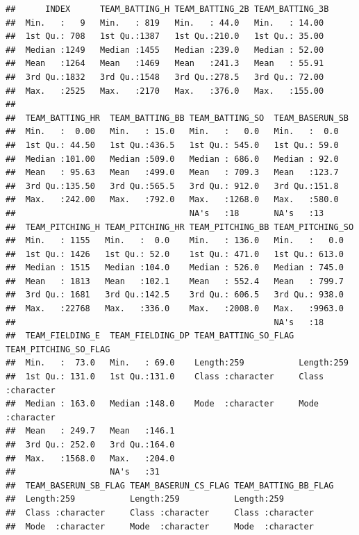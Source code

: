 \documentclass[
]{article}
\begin{document}
\begin{verbatim}
##      INDEX      TEAM_BATTING_H TEAM_BATTING_2B TEAM_BATTING_3B 
##  Min.   :   9   Min.   : 819   Min.   : 44.0   Min.   : 14.00  
##  1st Qu.: 708   1st Qu.:1387   1st Qu.:210.0   1st Qu.: 35.00  
##  Median :1249   Median :1455   Median :239.0   Median : 52.00  
##  Mean   :1264   Mean   :1469   Mean   :241.3   Mean   : 55.91  
##  3rd Qu.:1832   3rd Qu.:1548   3rd Qu.:278.5   3rd Qu.: 72.00  
##  Max.   :2525   Max.   :2170   Max.   :376.0   Max.   :155.00  
##                                                                
##  TEAM_BATTING_HR  TEAM_BATTING_BB TEAM_BATTING_SO  TEAM_BASERUN_SB
##  Min.   :  0.00   Min.   : 15.0   Min.   :   0.0   Min.   :  0.0  
##  1st Qu.: 44.50   1st Qu.:436.5   1st Qu.: 545.0   1st Qu.: 59.0  
##  Median :101.00   Median :509.0   Median : 686.0   Median : 92.0  
##  Mean   : 95.63   Mean   :499.0   Mean   : 709.3   Mean   :123.7  
##  3rd Qu.:135.50   3rd Qu.:565.5   3rd Qu.: 912.0   3rd Qu.:151.8  
##  Max.   :242.00   Max.   :792.0   Max.   :1268.0   Max.   :580.0  
##                                   NA's   :18       NA's   :13     
##  TEAM_PITCHING_H TEAM_PITCHING_HR TEAM_PITCHING_BB TEAM_PITCHING_SO
##  Min.   : 1155   Min.   :  0.0    Min.   : 136.0   Min.   :   0.0  
##  1st Qu.: 1426   1st Qu.: 52.0    1st Qu.: 471.0   1st Qu.: 613.0  
##  Median : 1515   Median :104.0    Median : 526.0   Median : 745.0  
##  Mean   : 1813   Mean   :102.1    Mean   : 552.4   Mean   : 799.7  
##  3rd Qu.: 1681   3rd Qu.:142.5    3rd Qu.: 606.5   3rd Qu.: 938.0  
##  Max.   :22768   Max.   :336.0    Max.   :2008.0   Max.   :9963.0  
##                                                    NA's   :18      
##  TEAM_FIELDING_E  TEAM_FIELDING_DP TEAM_BATTING_SO_FLAG TEAM_PITCHING_SO_FLAG
##  Min.   :  73.0   Min.   : 69.0    Length:259           Length:259           
##  1st Qu.: 131.0   1st Qu.:131.0    Class :character     Class :character     
##  Median : 163.0   Median :148.0    Mode  :character     Mode  :character     
##  Mean   : 249.7   Mean   :146.1                                              
##  3rd Qu.: 252.0   3rd Qu.:164.0                                              
##  Max.   :1568.0   Max.   :204.0                                              
##                   NA's   :31                                                 
##  TEAM_BASERUN_SB_FLAG TEAM_BASERUN_CS_FLAG TEAM_BATTING_BB_FLAG
##  Length:259           Length:259           Length:259          
##  Class :character     Class :character     Class :character    
##  Mode  :character     Mode  :character     Mode  :character    

\end{verbatim}
\end{document}
